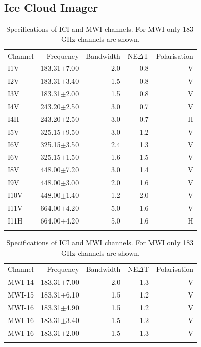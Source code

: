 \documentclass[amt, manuscript]{copernicus}
\begin{document}
\subsection{Ice Cloud Imager}
%
\begin{table}[t]
	\label{tab:ICI_MWI_channels}	
	\caption{Specifications of ICI and MWI channels. For MWI only 183\,GHz channels are shown.}
	\begin{tabular}{lrrrr}
		\tophline
		Channel & Frequency 	& Bandwidth  	&NE$\Delta$T	&Polarisation\\
		\middlehline
		I1V&	183.31$\pm$7.00    & 2.0 			& 0.8 		& V\\
		I2V&	183.31$\pm$3.40    & 1.5 			& 0.8 		& V\\
		I3V&	183.31$\pm$2.00    & 1.5 			& 0.8 		& V\\
		I4V&	243.20$\pm$2.50    & 3.0 			& 0.7 		& V\\
		I4H&	243.20$\pm$2.50    & 3.0 			& 0.7 		& H\\
		I5V&	325.15$\pm$9.50    & 3.0 			& 1.2 		& V\\
		I6V&	325.15$\pm$3.50    & 2.4 			& 1.3 		& V\\
		I6V&	325.15$\pm$1.50    & 1.6 			& 1.5 		& V\\
		I8V&	448.00$\pm$7.20    & 3.0 			& 1.4 		& V\\
		I9V&	448.00$\pm$3.00    & 2.0 			& 1.6 		& V\\
		I10V&	448.00$\pm$1.40    & 1.2 			& 2.0 		& V\\
		I11V&	664.00$\pm$4.20    & 5.0 			& 1.6 		& V\\
		I11H&	664.00$\pm$4.20    & 5.0 			& 1.6 		& H\\		
		\bottomhline
	\end{tabular}
	\begin{tabular}{lrrrr}
		\tophline
		Channel & Frequency 	& Bandwidth  	&NE$\Delta$T	&Polarisation\\
		\middlehline
		MWI-14&	183.31$\pm$7.00    & 2.0 			& 1.3 		& V\\
		MWI-15&	183.31$\pm$6.10    & 1.5 			& 1.2 		& V\\
		MWI-16&	183.31$\pm$4.90    & 1.5 			& 1.2 		& V\\
		MWI-16&	183.31$\pm$3.40    & 1.5 			& 1.2 		& V\\
		MWI-16&	183.31$\pm$2.00    & 1.5 			& 1.3 		& V\\	
		\bottomhline
	\end{tabular}
	\belowtable{} %
\end{table}
\end{document}
